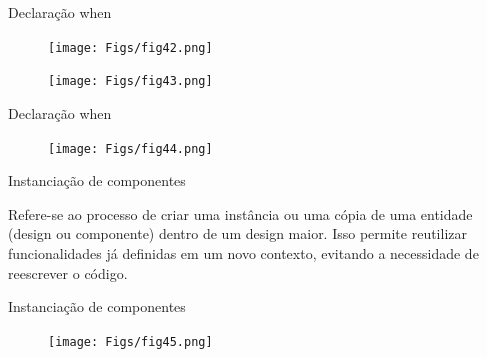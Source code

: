 \documentclass[aspectratio=169]{beamer}
\begin{document}
\begin{frame}{Declaração when}
	\justifying
	
	
	\begin{figure}[h]
		\centering
		\texttt{[image: Figs/fig42.png]}
	\end{figure}
	
	\begin{figure}[h]
	\centering
	\texttt{[image: Figs/fig43.png]}
	\end{figure}
	
\end{frame}
\begin{frame}{Declaração when}
	\justifying
	
	
	\begin{figure}[h]
	\centering
	\texttt{[image: Figs/fig44.png]}
	\end{figure}
	
	
\end{frame}
\begin{frame}{Instanciação de componentes}
	\justifying
	
	\begin{block}{}
	Refere-se ao processo de criar uma instância ou uma cópia de uma entidade (design ou componente) dentro de um design maior. Isso permite reutilizar funcionalidades já definidas em um novo contexto, evitando a necessidade de reescrever o código.
	
	\end{block}

\end{frame}

\begin{frame}{Instanciação de componentes}
	\justifying
	\begin{figure}[h]
		\centering
		\texttt{[image: Figs/fig45.png]}
	\end{figure}
	
	
\end{frame}
\end{document}
